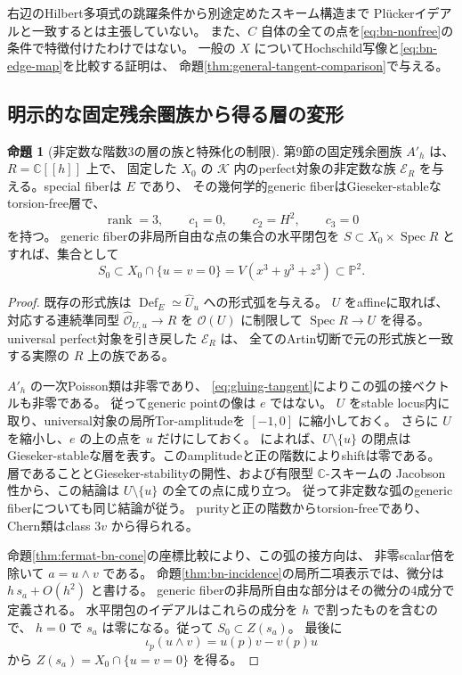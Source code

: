 \documentclass[a4paper,11pt]{ltjsarticle}
\theoremstyle{definition}
\newtheorem{theorem}{命題}[section]
\newcommand{\CC}{\mathbb C}
\newcommand{\OO}{\mathcal O}
\newcommand{\PP}{\mathbb P}
\newcommand{\Def}{\operatorname{Def}}
\newcommand{\rk}{\operatorname{rank}}
\begin{document}
右辺のHilbert多項式の跳躍条件から別途定めたスキーム構造まで
Pl\"uckerイデアルと一致するとは主張していない。
また、$C$ 自体の全ての点を\eqref{eq:bn-nonfree}の条件で特徴付けたわけではない。
一般の $X$ についてHochschild写像と\eqref{eq:bn-edge-map}を比較する証明は、
命題\ref{thm:general-tangent-comparison}で与える。

\subsection{明示的な固定残余圏族から得る層の変形}

\begin{theorem}[非定数な階数3の層の族と特殊化の制限]\label{thm:gluing-sheaf-arc}
第9節の固定残余圏族 $A'_h$ は、$R=\CC[[h]]$ 上で、
固定した $X_0$ の $\mathcal K$ 内のperfect対象の非定数な族
$\mathcal E_R$ を与える。special fiberは $E$ であり、
その幾何学的generic fiberはGieseker-stableなtorsion-free層で、
\[
 \rk=3,\qquad c_1=0,\qquad c_2=H^2,\qquad c_3=0
\]
を持つ。
generic fiberの非局所自由な点の集合の水平閉包を
$S\subset X_0\times\operatorname{Spec}R$ とすれば、集合として
\[
 S_0\subset
 X_0\cap\{u=v=0\}
 =V(x^3+y^3+z^3)\subset\PP^2.
\]
\end{theorem}

\begin{proof}
既存の形式族は
$\Def_E\simeq\widehat U_u$ への形式弧を与える。
$U$ をaffineに取れば、対応する連続準同型
$\widehat{\OO}_{U,u}\to R$ を $\OO(U)$ に制限して
$\operatorname{Spec}R\to U$ を得る。
universal perfect対象を引き戻した $\mathcal E_R$ は、
全てのArtin切断で元の形式族と一致する実際の $R$ 上の族である。

$A'_h$ の一次Poisson類は非零であり、
\eqref{eq:gluing-tangent}によりこの弧の接ベクトルも非零である。
従ってgeneric pointの像は $e$ ではない。
$U$ をstable locus内に取り、universal対象の局所Tor-amplitudeを
$[-1,0]$ に縮小しておく。
さらに $U$ を縮小し、$e$ の上の点を $u$ だけにしておく。
\cite[Proposition 5.5]{FLZ}によれば、$U\setminus\{u\}$ の閉点は
Gieseker-stableな層を表す。このamplitudeと正の階数によりshiftは零である。
層であることとGieseker-stabilityの開性、および有限型 $\CC$-スキームの
Jacobson性から、この結論は $U\setminus\{u\}$ の全ての点に成り立つ。
従って非定数な弧のgeneric fiberについても同じ結論が従う。
purityと正の階数からtorsion-freeであり、Chern類はclass $3v$ から得られる。

命題\ref{thm:fermat-bn-cone}の座標比較により、この弧の接方向は、
非零scalar倍を除いて $a=u\wedge v$ である。
命題\ref{thm:bn-incidence}の局所二項表示では、微分は
$h\,s_a+O(h^2)$ と書ける。
generic fiberの非局所自由な部分はその微分の4成分で定義される。
水平閉包のイデアルはこれらの成分を $h$ で割ったものを含むので、
$h=0$ で $s_a$ は零になる。従って $S_0\subset Z(s_a)$。
最後に
\[
 \iota_p(u\wedge v)=u(p)v-v(p)u
\]
から $Z(s_a)=X_0\cap\{u=v=0\}$ を得る。
\end{proof}
\end{document}
